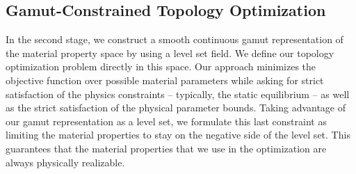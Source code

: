 \subsection{Gamut-Constrained Topology Optimization}
In the second stage, we construct a smooth continuous gamut representation of the material property space by using a level set field. We define our topology optimization problem directly in this space. Our approach minimizes the objective function over possible material parameters while asking for strict satisfaction of the physics constraints -- typically, the static equilibrium -- as well as the strict satisfaction of the physical parameter bounds. Taking advantage of our gamut representation as a level set, we formulate this last constraint as limiting the material properties to stay on the negative side of the level set. This guarantees that the material properties that we use in the optimization are always physically realizable.
